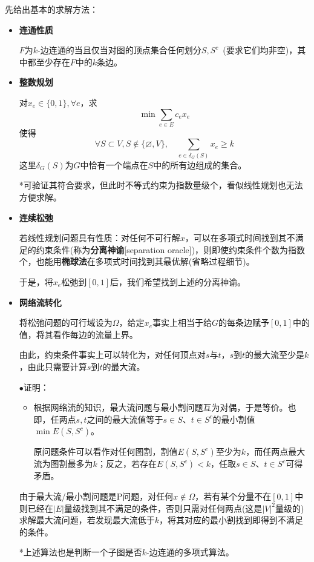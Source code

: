 \documentclass[a4paper,UTF8,fontset=windows]{ctexart}
\newcommand{\proo}[1]{{\kaishu $\bullet$证明：
\begin{itemize}
    \item[] #1
\end{itemize}
}}
\begin{document}
先给出基本的求解方法：
\begin{itemize}
    \item \textbf{连通性质}
    
    $F$为$k$-边连通的当且仅当对图的顶点集合任何划分$S,S^c$\ (要求它们均非空)，其中都至少存在$F$中的$k$条边。
    \item \textbf{整数规划}
    
    对$x_e\in\{0,1\},\forall e$，求
    $$\min\sum_{e\in E}c_ex_e$$
    使得
    $$\forall S\subset V,S\notin\{\varnothing,V\},\quad\sum_{e\in\delta_G(S)}x_e\ge k$$
    这里$\delta_G(S)$为$G$中恰有一个端点在$S$中的所有边组成的集合。

    *可验证其符合要求，但此时不等式约束为指数量级个，看似线性规划也无法方便求解。

    \item \textbf{连续松弛}

    若线性规划问题具有性质：对任何不可行解$x$，可以在多项式时间找到其不满足的约束条件(称为\textbf{分离神谕}[separation oracle])，则即使约束条件个数为指数个，也能用\textbf{椭球法}在多项式时间找到其最优解(省略过程细节)。

    于是，将$x_e$松弛到$[0,1]$后，我们希望找到上述的分离神谕。

    \item \textbf{网络流转化}
    
    将松弛问题的可行域设为$\Omega$，给定$x_e$事实上相当于给$G$的每条边赋予$[0,1]$中的值，将其看作每边的流量上界。

    由此，约束条件事实上可以转化为，对任何顶点对$s$与$t$，$s$到$t$的最大流至少是$k$，由此只需要计算$s$到$t$的最大流。

    \proo{
        根据网络流的知识，最大流问题与最小割问题互为对偶，于是等价。也即，任两点$s,t$之间的最大流值等于$s\in S$、$t\in S^c$的最小割值$\min E(S,S^c)$。
        
        原问题条件可以看作对任何图割，割值$E(S,S^c)$至少为$k$，而任两点最大流为图割最多为$k$；反之，若存在$E(S,S^c)<k$，任取$s\in S$、$t\in S^c$可得矛盾。
    }

    由于最大流/最小割问题是P问题，对任何$x\notin\Omega$，若有某个分量不在$[0,1]$中则已经在$|E|$量级找到其不满足的条件，否则只需对任何两点(这是$|V|^2$量级的)求解最大流问题，若发现最大流低于$k$，将其对应的最小割找到即得到不满足的条件。

    *上述算法也是判断一个子图是否$k$-边连通的多项式算法。
\end{itemize}
\end{document}
